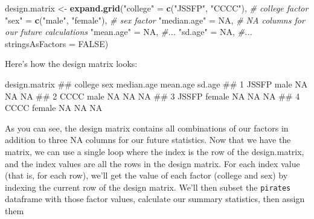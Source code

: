 \documentclass[]{book}
\newenvironment{Shaded}{\begin{snugshade}}{\end{snugshade}}
\newcommand{\KeywordTok}[1]{\textcolor[rgb]{0.13,0.29,0.53}{\textbf{#1}}}
\newcommand{\DataTypeTok}[1]{\textcolor[rgb]{0.13,0.29,0.53}{#1}}
\newcommand{\StringTok}[1]{\textcolor[rgb]{0.31,0.60,0.02}{#1}}
\newcommand{\CommentTok}[1]{\textcolor[rgb]{0.56,0.35,0.01}{\textit{#1}}}
\newcommand{\OtherTok}[1]{\textcolor[rgb]{0.56,0.35,0.01}{#1}}
\newcommand{\NormalTok}[1]{#1}
\theoremstyle{definition}
\theoremstyle{definition}
\theoremstyle{remark}
\begin{document}
\begin{Shaded}
\begin{Highlighting}[]
\NormalTok{design.matrix <-}\StringTok{ }\KeywordTok{expand.grid}\NormalTok{(}\StringTok{"college"}\NormalTok{ =}\StringTok{ }\KeywordTok{c}\NormalTok{(}\StringTok{"JSSFP"}\NormalTok{, }\StringTok{"CCCC"}\NormalTok{), }\CommentTok{# college factor}
                             \StringTok{"sex"}\NormalTok{ =}\StringTok{ }\KeywordTok{c}\NormalTok{(}\StringTok{"male"}\NormalTok{, }\StringTok{"female"}\NormalTok{), }\CommentTok{# sex factor}
                             \StringTok{"median.age"}\NormalTok{ =}\StringTok{ }\OtherTok{NA}\NormalTok{, }\CommentTok{# NA columns for our future calculations}
                             \StringTok{"mean.age"}\NormalTok{ =}\StringTok{ }\OtherTok{NA}\NormalTok{, }\CommentTok{#...}
                             \StringTok{"sd.age"}\NormalTok{ =}\StringTok{ }\OtherTok{NA}\NormalTok{, }\CommentTok{#...}
                             \DataTypeTok{stringsAsFactors =} \OtherTok{FALSE}\NormalTok{)}
\end{Highlighting}
\end{Shaded}

Here's how the design matrix looks:

\begin{Shaded}
\begin{Highlighting}[]
\NormalTok{design.matrix}
\NormalTok{##   college    sex median.age mean.age sd.age}
\NormalTok{## 1   JSSFP   male         NA       NA     NA}
\NormalTok{## 2    CCCC   male         NA       NA     NA}
\NormalTok{## 3   JSSFP female         NA       NA     NA}
\NormalTok{## 4    CCCC female         NA       NA     NA}
\end{Highlighting}
\end{Shaded}

As you can see, the design matrix contains all combinations of our
factors in addition to three NA columns for our future statistics. Now
that we have the matrix, we can use a single loop where the index is the
row of the design.matrix, and the index values are all the rows in the
design matrix. For each index value (that is, for each row), we'll get
the value of each factor (college and sex) by indexing the current row
of the design matrix. We'll then subset the \texttt{pirates} dataframe
with those factor values, calculate our summary statistics, then assign
them
\end{document}
